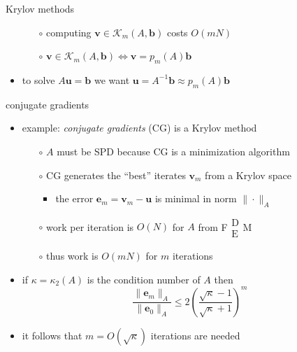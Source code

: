 \documentclass[hide notes,intlimits,usenames,dvipsnames]{beamer}
\newcommand{\bb}{\mathbf{b}}
\newcommand{\be}{\mathbf{e}}
\newcommand{\bu}{\mathbf{u}}
\newcommand{\bv}{\mathbf{v}}
\newcommand{\FM}{F$\begin{smallmatrix} \text{D} \\ \text{E} \end{smallmatrix}$M\xspace}
\begin{document}
\begin{frame}{Krylov methods}
\begin{itemize}
    \vspace{2mm}
	\begin{itemize}
	\item[$\circ$] computing $\bv \in \mathcal{K}_m(A,\bb)$ costs $O(mN)$
	\item[$\circ$] $\bv \in \mathcal{K}_m(A,\bb) \iff \bv = p_m(A) \bb$
	\end{itemize}
\item to solve $A\bu=\bb$ we want $\bu = A^{-1}\bb \approx p_m(A) \bb$
\end{itemize}
\end{frame}


\begin{frame}{conjugate gradients}

\begin{itemize}
\item example: \emph{conjugate gradients} (CG) is a Krylov method
	\begin{itemize}
	\item[$\circ$] $A$ must be SPD because CG is a minimization algorithm
	\item[$\circ$] CG generates the ``best'' iterates $\bv_m$ from a Krylov space
		\begin{itemize}
		\item the error $\be_m=\bv_m-\bu$ is minimal in norm $\|\cdot\|_A$
		\end{itemize}
	\item[$\circ$] work per iteration is $O(N)$ for $A$ from \FM
	\item[$\circ$] thus work is $O(mN)$ for $m$ iterations
	\end{itemize}
\item if $\kappa=\kappa_2(A)$ is the condition number of $A$ then
	$$\frac{\|\be_m\|_A}{\|\be_0\|_A} \le 2 \left(\frac{\sqrt{\kappa}-1}{\sqrt{\kappa}+1}\right)^m$$
\item it follows that $m = O(\sqrt{\kappa})$ iterations are needed
\end{itemize}
\end{frame}
\end{document}
